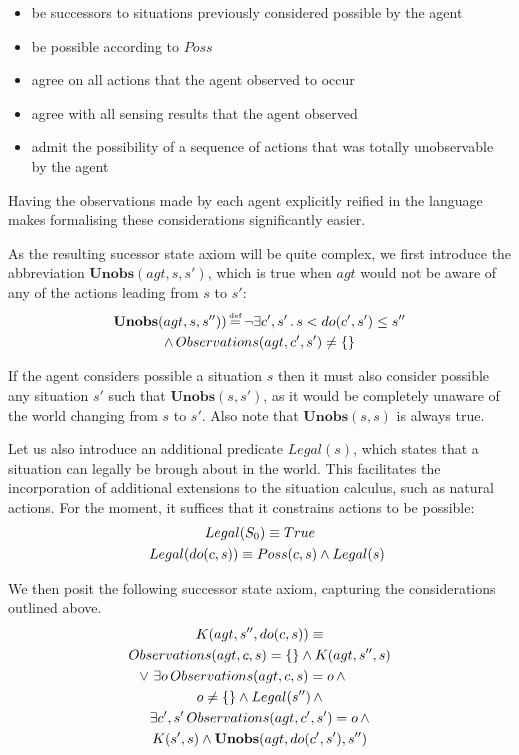 \documentclass[letterpaper]{article}
\newcommand{\isdef}{\hbox{$\stackrel{\mbox{\tiny def}}{=}$}}
\begin{document}
\begin{itemize}
\item be successors to situations previously considered possible by the
agent 
\item be possible according to $Poss$ 
\item agree on all actions that the agent observed to occur 
\item agree with all sensing results that the agent observed 
\item admit the possibility of a sequence of actions that was totally unobservable
by the agent 
\end{itemize}
Having the observations made by each agent explicitly reified in the
language makes formalising these considerations significantly easier. 

As the resulting sucessor state axiom will be quite complex, we first
introduce the abbreviation $\mathbf{Unobs}(agt,s,s')$, which is true
when $agt$ would not be aware of any of the actions leading from
$s$ to $s'$:
\begin{multline}
\mathbf{Unobs}(agt,s,s''))\,\isdef\,\neg\exists c',s'\,.\,s<do(c',s')\leq s''\\
\wedge\, Observations(agt,c',s')\neq\{\}
\end{multline}


If the agent considers possible a situation $s$ then it must also
consider possible any situation $s'$ such that $\mathbf{Unobs}(s,s')$,
as it would be completely unaware of the world changing from $s$
to $s'$. Also note that $\mathbf{Unobs}(s,s)$ is always true.

Let us also introduce an additional predicate $Legal(s)$, which states
that a situation can legally be brough about in the world. This facilitates
the incorporation of additional extensions to the situation calculus,
such as natural actions. For the moment, it suffices that it constrains
actions to be possible:
\begin{multline}
Legal(S_{0})\equiv True\\
\shoveleft{Legal(do(c,s))\equiv Poss(c,s)\wedge Legal(s)}\\
\end{multline}


We then posit the following successor state axiom, capturing the considerations
outlined above.
\begin{multline}
K(agt,s'',do(c,s))\equiv\\
Observations(agt,c,s)=\{\}\wedge K(agt,s'',s)\\
\shoveleft{\vee\,\,\exists o\, Observations(agt,c,s)=o\,\wedge}\\
o\neq\{\}\wedge Legal(s'')\,\wedge\\
\exists c',s'\, Observations(agt,c',s')=o\,\wedge\\
 K(s',s)\wedge\mathbf{Unobs}(agt,do(c',s'),s'')
\end{multline}
\end{document}
